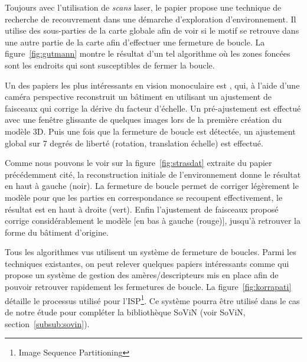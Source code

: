 Toujours avec l'utilisation de \emph{scans} laser, le papier \cite{Gutmann99} propose une technique de recherche de recouvrement dans une démarche d'exploration d'environnement. 
Il utilise des sous-parties de la carte globale afin de voir si le motif se retrouve dans une autre partie de la carte afin d'effectuer une fermeture de boucle.
La figure~\ref{fig:gutmann} montre le résultat d'un tel algorithme où les zones foncées sont les endroits qui sont susceptibles de fermer la boucle. 

Un des papiers les plus intéressants en vision monoculaire est \cite{Strasdat10}, qui, à l'aide d'une caméra perspective reconstruit un bâtiment en utilisant un ajustement de faisceaux qui corrige la dérive du facteur d'échelle.
Un pré-ajustement est effectué avec une fenêtre glissante de quelques images lors de la première création du modèle 3D.
Puis une fois que la fermeture de boucle est détectée, un ajustement global sur 7 degrés de liberté (rotation, translation échelle) est effectué.

Comme nous pouvons le voir sur la figure~\ref{fig:strasdat} extraite du papier précédemment cité, la reconstruction initiale de l'environnement donne le résultat en haut à gauche (noir).
La fermeture de boucle permet de corriger légèrement le modèle pour que les parties en correspondance se recoupent effectivement, le résultat est en haut à droite (vert).
Enfin l'ajustement de faisceaux proposé corrige considérablement le modèle [en bas à gauche (rouge)], jusqu'à retrouver la forme du bâtiment d'origine.

\vspace{5mm}
Tous les algorithmes vus utilisent un système de fermeture de boucles.
Parmi les techniques existantes, on peut relever quelques papiers intéressants comme \cite{Korrapati11} qui propose un système de gestion des amères/descripteurs mis en place afin de pouvoir retrouver rapidement les fermetures de boucle.
La figure~\ref{fig:korrapati} détaille le processus utilisé pour l'ISP\footnote{Image Sequence Partitioning}.
Ce système pourra être utilisé dans le cas de notre étude pour compléter la bibliothèque SoViN (voir SoViN, section~\ref{subsub:sovin}).



